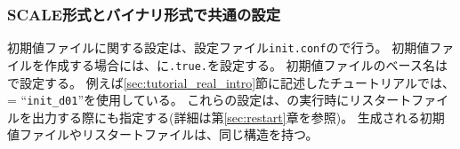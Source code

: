\subsubsection{SCALE形式とバイナリ形式で共通の設定} \label{sec:datainput_common_setting}

初期値ファイルに関する設定は、設定ファイル\verb|init.conf|ので行う。
%
初期値ファイルを作成する場合には、に\verb|.true.|を設定する。
初期値ファイルのベース名はで設定する。
例えば\ref{sec:tutorial_real_intro}節に記述したチュートリアルでは、 = ``\verb|init_d01|''を使用している。
これらの設定は、\scalerm の実行時にリスタートファイルを出力する際にも指定する(詳細は第\ref{sec:restart}章を参照)。
生成される初期値ファイルやリスタートファイルは、同じ構造を持つ。


